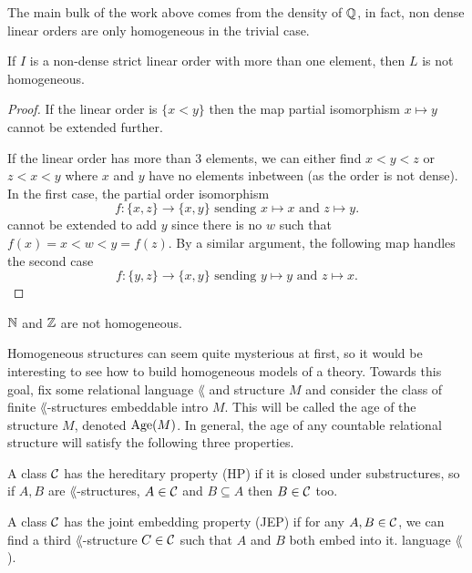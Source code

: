 The main bulk of the work above comes from the density of $\mathbb{Q}$, in fact, non dense linear orders are
only homogeneous in the trivial case.

\begin{prop}
  If $I$ is a non-dense strict linear order with more than one element, then $L$ is not homogeneous.
\end{prop}
\begin{proof}
  If the linear order is $\{x < y\}$ then the map partial isomorphism
  $x \mapsto y$ cannot be extended further.

  If the linear order has more than 3 elements, we can either find $x < y < z$ or
  $z < x < y$ where $x$ and $y$ have no elements inbetween (as the order is not dense). In the first
  case, the partial order isomorphism
  \begin{equation*}
    f : \{x,z\} \to \{x,y\} \text{ sending } x \mapsto x \text{ and } z \mapsto y.
  \end{equation*}
  cannot be extended to add $y$ since there is no $w$ such that $f(x) = x < w < y = f(z)$.
  By a similar argument, the following map handles the second case
  \begin{equation*}
    f : \{y,z\} \to \{x,y\} \text{ sending } y \mapsto y \text{ and } z \mapsto x.
  \end{equation*}
\end{proof}

\begin{cor}
  $\mathbb{N}$ and $\mathbb{Z}$ are not homogeneous.
\end{cor}

Homogeneous structures can seem quite mysterious at first, so
it would be interesting to see how to build homogeneous models of a theory. Towards this goal,
fix some relational language $\lang$ and structure $M$ and consider the class of finite
$\lang$-structures embeddable intro $M$.
This will be called the age of the structure $M$, denoted $\operatorname{Age}(M)$. In general, the age of any
countable relational structure will satisfy the following three properties.

\begin{defn}
  A class $\mathcal{C}$ has the hereditary property (HP) if it is closed under substructures, so if
  $A, B$ are $\lang$-structures, $A \in \mathcal{C}$ and $B \subseteq A$ then $B \in \mathcal{C}$ too.
\end{defn}

\begin{defn}
  A class $\mathcal{C}$ has the joint embedding property (JEP) if for any $A,B \in \mathcal{C}$, we can find a
  third $\lang$-structure $C \in \mathcal{C}$ such that $A$ and $B$ both embed into it.
  language $\lang$).
\end{defn}

